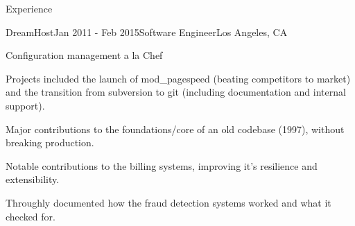 \documentclass{resume} %
\begin{document}
\begin{rSection}{Experience}
\begin{rSubsection}{DreamHost}{Jan 2011 - Feb 2015}{Software Engineer}{Los Angeles, CA}
\item Configuration management a la Chef
\item Projects included the launch of mod\_pagespeed (beating competitors to market) and the transition from subversion to git (including documentation and internal support).
\item Major contributions to the foundations/core of an old codebase (1997), without breaking production.
\item Notable contributions to the billing systems, improving it's resilience and extensibility.
\item Throughly documented how the fraud detection systems worked and what it checked for.

\end{rSubsection}
\end{rSection}
\end{document}
